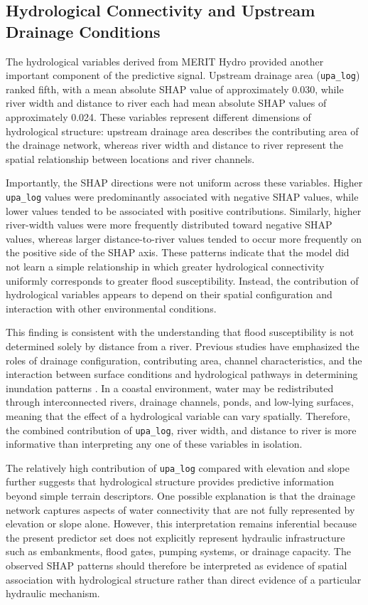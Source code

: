 \documentclass[11pt,twoside]{article}
\begin{document}
\subsection{Hydrological Connectivity and Upstream Drainage Conditions}\label{hydrological-connectivity}

The hydrological variables derived from MERIT Hydro provided another important component of the predictive signal. Upstream drainage area (\texttt{upa\_log}) ranked fifth, with a mean absolute SHAP value of approximately 0.030, while river width and distance to river each had mean absolute SHAP values of approximately 0.024. These variables represent different dimensions of hydrological structure: upstream drainage area describes the contributing area of the drainage network, whereas river width and distance to river represent the spatial relationship between locations and river channels.

Importantly, the SHAP directions were not uniform across these variables. Higher \texttt{upa\_log} values were predominantly associated with negative SHAP values, while lower values tended to be associated with positive contributions. Similarly, higher river-width values were more frequently distributed toward negative SHAP values, whereas larger distance-to-river values tended to occur more frequently on the positive side of the SHAP axis. These patterns indicate that the model did not learn a simple relationship in which greater hydrological connectivity uniformly corresponds to greater flood susceptibility. Instead, the contribution of hydrological variables appears to depend on their spatial configuration and interaction with other environmental conditions.

This finding is consistent with the understanding that flood susceptibility is not determined solely by distance from a river. Previous studies have emphasized the roles of drainage configuration, contributing area, channel characteristics, and the interaction between surface conditions and hydrological pathways in determining inundation patterns \cite{Costache2024, jeddah2025, Alcntara2025, Rahimi2026}. In a coastal environment, water may be redistributed through interconnected rivers, drainage channels, ponds, and low-lying surfaces, meaning that the effect of a hydrological variable can vary spatially. Therefore, the combined contribution of \texttt{upa\_log}, river width, and distance to river is more informative than interpreting any one of these variables in isolation.

The relatively high contribution of \texttt{upa\_log} compared with elevation and slope further suggests that hydrological structure provides predictive information beyond simple terrain descriptors. One possible explanation is that the drainage network captures aspects of water connectivity that are not fully represented by elevation or slope alone. However, this interpretation remains inferential because the present predictor set does not explicitly represent hydraulic infrastructure such as embankments, flood gates, pumping systems, or drainage capacity. The observed SHAP patterns should therefore be interpreted as evidence of spatial association with hydrological structure rather than direct evidence of a particular hydraulic mechanism.
\end{document}
